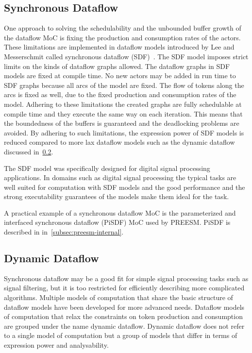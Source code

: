 \subsection{Synchronous Dataflow}
\label{subsec:synchronous-dataflow}
One approach to solving the schedulability and the unbounded buffer growth of the dataflow MoC is fixing the production and consumption rates of the actors. These limitations are implemented in dataflow models introduced by Lee and Messerschmit called synchronous dataflow (SDF)~\cite{lee1987synchronous}. The SDF model imposes strict limits on the kinds of dataflow graphs allowed. The dataflow graphs in SDF models are fixed at compile time. No new actors may be added in run time to SDF graphs because all arcs of the model are fixed. The flow of tokens along the arcs is fixed as well, due to the fixed production and consumption rates of the model. Adhering to these limitations the created graphs are fully schedulable at compile time and they execute the same way on each iteration. This means that the boundedness of the buffers is guaranteed and the deadlocking problems are avoided. By adhering to such limitations, the expression power of SDF models is reduced compared to more lax dataflow models such as the dynamic dataflow discussed in~\ref{subsec:dynamic-dataflow}.~\cite{lee2015introduction}

The SDF model was specifically designed for digital signal processing applications. In domains such as digital signal processing the typical tasks are well suited for computation with SDF models and the good performance and the strong executability guarantees of the models make them ideal for the task.~\cite{lee2015introduction}

A practical example of a synchronous dataflow MoC is the parameterized and interfaced synchronous dataflow (PiSDF) MoC used by PREESM. PiSDF is described in in~\ref{subsec:preesm-internal}.

\subsection{Dynamic Dataflow}
\label{subsec:dynamic-dataflow}
Synchronous dataflow may be a good fit for simple signal processing tasks such as signal filtering, but it is too restricted for efficiently describing more complicated algorithms. Multiple models of computation that share the basic structure of dataflow models have been developed for more advanced needs. Dataflow models of computation that relax the constraints on token production and consumption are grouped under the name dynamic dataflow. Dynamic dataflow does not refer to a single model of computation but a group of models that differ in terms of expression power and analysability.~\cite{bhattacharyya2013handbook}

